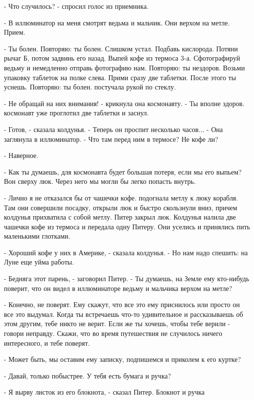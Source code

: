 \par- Что случилось? - спросил голос из приемника.
\par- В иллюминатор на меня смотрят ведьма и мальчик. Они верхом на 
метле. Прием.
\par- Ты болен. Повторяю: ты болен. Слишком устал. Подбавь кислорода. 
Потяни рычаг Б, потом задвинь его назад. Выпей кофе из термоса 3-а. 
Сфотографируй ведьму и немедленно отправь фотографию нам. Повторяю: ты 
нездоров. Возьми упаковку таблеток на полке слева. Прими сразу две 
таблетки. После этого ты уснешь. Повторяю: ты болен.
 постучала рукой по стеклу.
\par- Не обращай на них внимания! - крикнула она космонавту. - Ты 
вполне здоров.
 космонавт уже проглотил две таблетки и заснул.
\par- Готов, - сказала колдунья. - Теперь он проспит несколько 
часов... - Она заглянула в иллюминатор. - Что там перед ним в термосе? 
Не кофе ли?
\par- Наверное.
\par- Как ты думаешь, для космонавта будет большая потеря, если мы его 
выпьем? Вон сверху люк. Через него мы могли бы легко попасть внутрь.
\par- Лично я не отказался бы от чашечки кофе.
 подогнала метлу к люку корабля. Там они совершили 
посадку, открыли люк и быстро скользнули вниз, причем колдунья 
прихватила с собой метлу. Питер закрыл люк. Колдунья налила две 
чашечки кофе из термоса и передала одну Питеру. Они уселись и 
принялись пить маленькими глотками.
\par- Хороший кофе у них в Америке, - сказала колдунья. - Но нам надо 
спешить: на Луне еще уйма работы.
\par- Бедняга этот парень, - заговорил Питер. - Ты думаешь, на Земле 
ему кто-нибудь поверит, что он видел в иллюминаторе ведьму и мальчика 
верхом на метле?
\par- Конечно, не поверят. Ему скажут, что все это ему приснилось или 
просто он все это выдумал. Когда ты встречаешь что-то удивительное и 
рассказываешь об этом другим, тебе никто не верит. Если же ты хочешь, 
чтобы тебе верили - говори неправду. Скажи, что во время путешествия 
не случилось ничего интересного, и тебе поверят.
\par- Может быть, мы оставим ему записку, подпишемся и приколем к его 
куртке?
\par- Давай, только побыстрее. У тебя есть бумага и ручка?
\par- Я вырву листок из его блокнота, - сказал Питер. Блокнот и ручка 

